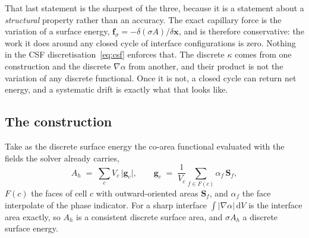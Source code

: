 \documentclass[preprint,3p,11pt]{elsarticle}
\begin{document}
That last statement is the sharpest of the three, because it is a statement about a
\emph{structural} property rather than an accuracy. The exact capillary force is the
variation of a surface energy, $\mathbf f_\sigma=-\delta(\sigma A)/\delta\mathbf x$, and is
therefore conservative: the work it does around any closed cycle of interface
configurations is zero. Nothing in the CSF discretisation~\eqref{eq:csf} enforces that. The
discrete $\kappa$ comes from one construction and the discrete $\nabla\alpha$ from another,
and their product is not the variation of any discrete functional. Once it is not, a closed
cycle can return net energy, and a systematic drift is exactly what that looks like.

\subsection{The construction}
Take as the discrete surface energy the co-area functional evaluated with the fields the
solver already carries,
\begin{equation}
  A_h \;=\; \sum_{c} V_c\,\lvert\mathbf g_c\rvert ,
  \qquad
  \mathbf g_c \;=\; \frac{1}{V_c}\sum_{f\in F(c)} \alpha_f\,\mathbf S_f ,
  \label{eq:discreteArea}
\end{equation}
$F(c)$ the faces of cell $c$ with outward-oriented areas $\mathbf S_f$, and $\alpha_f$ the
face interpolate of the phase indicator. For a sharp interface $\int\lvert\nabla\alpha\rvert
\,\mathrm dV$ is the interface area exactly, so $A_h$ is a consistent discrete surface area,
and $\sigma A_h$ a discrete surface energy.
\end{document}
